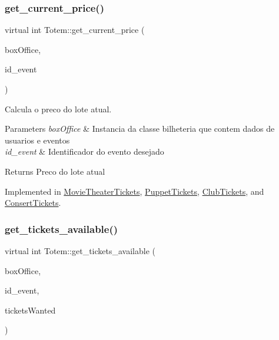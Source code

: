 \subsubsection{\texorpdfstring{get\+\_\+current\+\_\+price()}{get\_current\_price()}}
{\footnotesize\ttfamily virtual int Totem\+::get\+\_\+current\+\_\+price (\begin{DoxyParamCaption}\item[{\hyperlink{class_box_office}{Box\+Office} $\ast$}]{box\+Office,  }\item[{int}]{id\+\_\+event }\end{DoxyParamCaption})\hspace{0.3cm}{\ttfamily [pure virtual]}}



Calcula o preco do lote atual. 


\begin{DoxyParams}{Parameters}
{\em box\+Office} & Instancia da classe bilheteria que contem dados de usuarios e eventos \\
\hline
{\em id\+\_\+event} & Identificador do evento desejado \\
\hline
\end{DoxyParams}
\begin{DoxyReturn}{Returns}
Preco do lote atual 
\end{DoxyReturn}


Implemented in \hyperlink{class_movie_theater_tickets_a51e0ad53bf50085a53625a97bf4ebd6a}{Movie\+Theater\+Tickets}, \hyperlink{class_puppet_tickets_a73477909b6f61d1fff4afff51d26e6b6}{Puppet\+Tickets}, \hyperlink{class_club_tickets_a1de83341b2457f0352e1cdd86d27e1e3}{Club\+Tickets}, and \hyperlink{class_consert_tickets_a313b214e5fb67be2561563756ab79ad9}{Consert\+Tickets}.

\mbox{\label{class_totem_a1849ecd70214b1b2a1b4c116fdbf6d81}} 
\subsubsection{\texorpdfstring{get\+\_\+tickets\+\_\+available()}{get\_tickets\_available()}}
{\footnotesize\ttfamily virtual int Totem\+::get\+\_\+tickets\+\_\+available (\begin{DoxyParamCaption}\item[{\hyperlink{class_box_office}{Box\+Office} $\ast$}]{box\+Office,  }\item[{int}]{id\+\_\+event,  }\item[{int}]{tickets\+Wanted }\end{DoxyParamCaption})\hspace{0.3cm}{\ttfamily [pure virtual]}}




